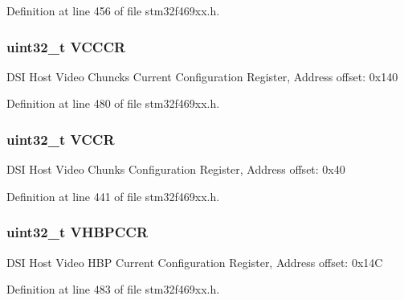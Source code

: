 Definition at line 456 of file stm32f469xx.\+h.

\subsubsection[{\texorpdfstring{V\+C\+C\+CR}{VCCCR}}]{ uint32\+\_\+t V\+C\+C\+CR}\hypertarget{struct_d_s_i___type_def_a3dfde0e1ba08eb3f49d56be82f70279d}{}\label{struct_d_s_i___type_def_a3dfde0e1ba08eb3f49d56be82f70279d}
D\+SI Host Video Chuncks Current Configuration Register, Address offset\+: 0x140 

Definition at line 480 of file stm32f469xx.\+h.

\subsubsection[{\texorpdfstring{V\+C\+CR}{VCCR}}]{ uint32\+\_\+t V\+C\+CR}\hypertarget{struct_d_s_i___type_def_a697344e75543c71d76b265916e4cffba}{}\label{struct_d_s_i___type_def_a697344e75543c71d76b265916e4cffba}
D\+SI Host Video Chunks Configuration Register, Address offset\+: 0x40 

Definition at line 441 of file stm32f469xx.\+h.

\subsubsection[{\texorpdfstring{V\+H\+B\+P\+C\+CR}{VHBPCCR}}]{ uint32\+\_\+t V\+H\+B\+P\+C\+CR}\hypertarget{struct_d_s_i___type_def_a1b33578fd6aff98f4435bc3685b49939}{}\label{struct_d_s_i___type_def_a1b33578fd6aff98f4435bc3685b49939}
D\+SI Host Video H\+BP Current Configuration Register, Address offset\+: 0x14C 

Definition at line 483 of file stm32f469xx.\+h.


